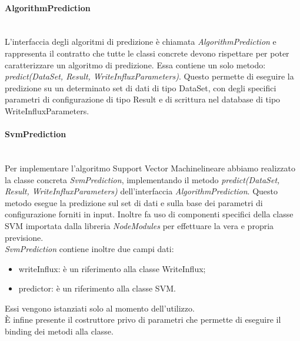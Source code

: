 \paragraph*{AlgorithmPrediction} \mbox{}\\ [1mm]
L'interfaccia degli algoritmi di predizione è chiamata \textit{AlgorithmPrediction} e rappresenta il contratto che tutte le classi concrete devono rispettare per poter caratterizzare un algoritmo di predizione. Essa contiene un solo metodo: \textit{predict(DataSet, Result, WriteInfluxParameters)}. Questo permette di eseguire la predizione su un determinato set di dati di tipo DataSet, con degli specifici parametri di configurazione di tipo Result e di scrittura nel database di tipo WriteInfluxParameters.
\paragraph*{SvmPrediction} \mbox{}\\ [1mm]
Per implementare l'algoritmo Support Vector Machine\glosp lineare abbiamo realizzato la classe concreta \textit{SvmPrediction}, implementando il metodo \textit{predict(DataSet, Result, WriteInfluxParameters)} dell'interfaccia \textit{AlgorithmPrediction}.
Questo metodo esegue la predizione sul set di dati e sulla base dei parametri di configurazione forniti in input. Inoltre fa uso di componenti specifici della classe SVM importata dalla libreria \textit{NodeModules} per effettuare la vera e propria previsione. \\
\textit{SvmPrediction} contiene inoltre due campi dati:
\begin{itemize}
	\item writeInflux: è un riferimento alla classe WriteInflux;
	\item predictor: è un riferimento alla classe SVM.
\end{itemize}
Essi vengono istanziati solo al momento dell'utilizzo. \\
È infine presente il costruttore privo di parametri che permette di eseguire il binding dei metodi alla classe.
